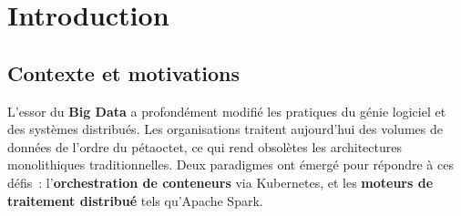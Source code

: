 \documentclass[12pt,a4paper,french]{report}
\newcommand{\kw}[1]{\textbf{#1}}
\begin{document}
\begin{abstract}
\noindent
Ce rapport présente le travail réalisé dans le cadre du projet de l'UE \emph{Infrastructures pour le Cloud et le Big Data}. L'objectif est de déployer et d'opérer une infrastructure complète de traitement distribué des données en tirant parti des technologies modernes du Cloud et de l'orchestration de conteneurs.

Le projet se décompose en trois phases techniques~: (1) le déploiement d'un cluster \kw{Kubernetes} sur des machines virtuelles hébergées sur \kw{Google Cloud Platform} (GCP)~; (2) l'instrumentation de ce cluster avec \kw{Prometheus} et \kw{Grafana} pour le monitoring des ressources~; (3) le déploiement d'\kw{Apache Spark} en mode cluster et l'exécution de l'application de référence \kw{WordCount} avec collecte de métriques.

L'ensemble de l'infrastructure est défini sous forme de code (\emph{Infrastructure as Code}), ce qui garantit sa reproductibilité. Ce rapport détaille les choix d'architecture, les configurations mises en \oe{}uvre et les observations tirées des expérimentations.

\medskip
\noindent\textbf{Mots-clés~:} Kubernetes, GCP, Prometheus, Grafana, Apache Spark, Big Data, WordCount, conteneurisation, monitoring, Infrastructure as Code.
\end{abstract}

\tableofcontents
\listoffigures
\listoftables
\clearpage

\chapter{Introduction}

\section{Contexte et motivations}

L'essor du \kw{Big Data} a profondément modifié les pratiques du génie logiciel et des systèmes distribués. Les organisations traitent aujourd'hui des volumes de données de l'ordre du pétaoctet, ce qui rend obsolètes les architectures monolithiques traditionnelles. Deux paradigmes ont émergé pour répondre à ces défis~: l'\kw{orchestration de conteneurs} via Kubernetes, et les \kw{moteurs de traitement distribué} tels qu'Apache Spark.
\end{document}
